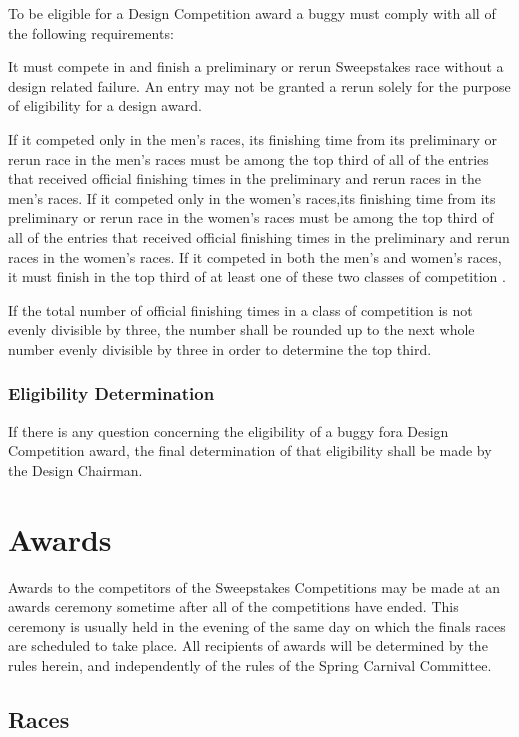 \documentclass[openany]{book}
\begin{document}
To be eligible for a Design Competition award a buggy must comply with all of the following requirements:

It must compete in and finish a preliminary or rerun Sweepstakes race without a design related failure. An entry may not be granted a rerun solely for the purpose of eligibility for a design award.

If it competed only in the men's races, its finishing time from its preliminary or rerun race in the men's races must be among the top third of all of the entries that received official finishing times in the preliminary and rerun races in the men's races. If it competed only in the women's races,its finishing time from its preliminary or rerun race in the women's races must be among the top third of all of the entries that received official finishing times in the preliminary and rerun races in the women's races. If it competed in both the men's and women's races, it must finish in the top third of at least one of these two classes of competition .

If the total number of official finishing times in a class of competition is not evenly divisible by three, the number shall be rounded up to the next whole number evenly divisible by three in order to determine the top third.

\subsection{Eligibility Determination}

If there is any question concerning the eligibility of a buggy fora Design Competition award, the final determination of that eligibility shall be made by the Design Chairman.

\chapter{Awards}

Awards to the competitors of the Sweepstakes Competitions may be made at an awards ceremony sometime after all of the competitions have ended. This ceremony is usually held in the evening of the same day on which the finals races are scheduled to take place. All recipients of awards will be determined by the rules herein, and independently of the rules of the Spring Carnival Committee.

\section{Races}
\end{document}
